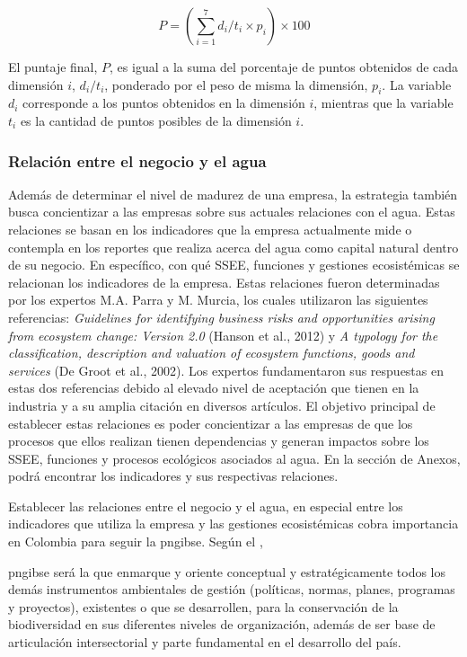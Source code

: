 \begin{equation} \label{eq:nivel-madurez}
P = (\sum_{i=1}^{7} d_i/t_i \times p_i) \times 100
\end{equation} 

El puntaje final, $P$, es igual a la suma del porcentaje de  puntos obtenidos de cada dimensión $i$, $d_i/t_i$, ponderado por el peso de misma la dimensión, $p_i$. La variable $d_i$ corresponde a los puntos obtenidos en la dimensión $i$, mientras que la variable $t_i$ es la cantidad de puntos posibles de la dimensión $i$.

\subsubsection{Relación entre el negocio y el agua}
Además de determinar el nivel de madurez de una empresa, la estrategia también busca concientizar a las empresas sobre sus actuales relaciones con el agua. Estas relaciones se basan en los indicadores que la empresa actualmente mide o contempla en los reportes que realiza acerca del agua como capital natural dentro de su negocio. En específico, con qué SSEE, funciones y gestiones ecosistémicas se relacionan los indicadores de la empresa. Estas relaciones fueron determinadas por los expertos M.A. Parra y M. Murcia, los cuales utilizaron las siguientes referencias: \textit{Guidelines for identifying business risks and opportunities arising from ecosystem change: Version 2.0} (Hanson et al., 2012) y \textit{A typology for the classification, description and valuation of ecosystem functions, goods and services} (De Groot et al., 2002). Los expertos fundamentaron sus respuestas en estas dos referencias debido al elevado nivel de aceptación que tienen en la industria y a su amplia citación en diversos artículos. El objetivo principal de establecer estas relaciones es poder concientizar a las empresas de que los procesos que ellos realizan tienen dependencias y generan impactos sobre los SSEE, funciones y procesos ecológicos asociados al agua.  En la sección de Anexos, podrá encontrar los indicadores y sus respectivas relaciones. 

Establecer las relaciones entre el negocio y el agua, en especial entre los indicadores que utiliza la empresa y las gestiones ecosistémicas cobra importancia en Colombia para seguir la \acrfull{pngibse}. Según el \textcite{ministerio-de-ambiente-y-desarrollo-sostenible-2012},

\hfill
\par
\leftskip=0.35in \rightskip=0.35in
\acrshort{pngibse} será la que enmarque y oriente conceptual y estratégicamente todos los demás instrumentos ambientales de gestión (políticas, normas, planes, programas y proyectos), existentes o que se desarrollen, para la conservación de la biodiversidad en sus diferentes niveles de organización, además de ser base de articulación intersectorial y parte fundamental en el desarrollo del país.

